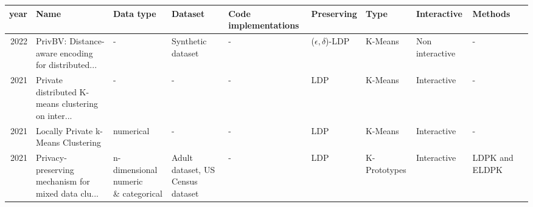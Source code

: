 \begin{landscape}
  \begin{table}[ht]
    \centering
    \begin{tabular}{rlllllllll}
      \toprule
      year                                            & Name                                               & Data type                         & Dataset                                            & Code implementations                               & Preserving               & Type                & Interactive     & Methods                          \\
      \midrule
      2022 \citep{sun_privbv_2022}                    & PrivBV: Distance-aware encoding for distributed... & -                                 & Synthetic dataset                                  & -                                                  & ($\epsilon, \delta$)-LDP & K-Means             & Non interactive & -                                \\
      2021 \citep{9679364}                            & Private distributed K-means clustering on inter... & -                                 & -                                                  & -                                                  & LDP                      & K-Means             & Interactive     & -                                \\
      2021 \citep{stemmer_locally_2021}               & Locally Private k-Means Clustering                 & numerical                         & -                                                  & -                                                  & LDP                      & K-Means             & Interactive     & -                                \\
      2021 \citep{yuan_privacypreserving_2021}        & Privacy‐preserving mechanism for mixed data clu... & \shortstack{n-dimensional numeric                                                                                                                                                                                                                 \\ \& categorical} & Adult dataset, US Census dataset                   & -                                                  & LDP                      & K-Prototypes        & Interactive     & LDPK and ELDPK                            \\

\end{tabular}
\end{table}
\end{landscape}
